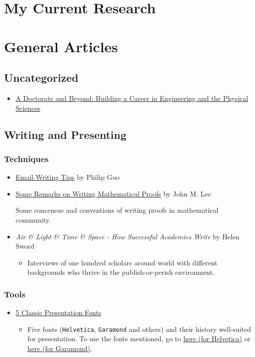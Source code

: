 \documentclass[11pt]{article}
\begin{document}
\section{My Current Research}
\label{sec-6}

\section{General Articles}
\label{sec-7}
\subsection{Uncategorized}
\label{sec-7-1}
\begin{itemize}
\item \href{http://www.adoctorateandbeyond.com/}{A Doctorate and Beyond: Building a Career in Engineering and the Physical Sciences}
\end{itemize}
\subsection{Writing and Presenting}
\label{sec-7-2}
\subsubsection{Techniques}
\label{sec-7-2-1}
\begin{itemize}
\item \href{http://pgbovine.net/email-tips.htm}{Email Writing Tips} by Philip Guo
\item \href{https://sites.math.washington.edu/~lee/Writing/writing-proofs.pdf}{Some Remarks on Writing Mathematical Proofs} by John M. Lee

Some concensus and conventions of writing proofs in mathematical community.
\item \emph{Air \& Light \& Time \& Space - How Successful Academics Write} by Helen Sword
\begin{itemize}
\item Interviews of one hundred scholars around world with different backgrounds who thrive
in the publish-or-perish environment.
\end{itemize}
\end{itemize}
\subsubsection{Tools}
\label{sec-7-2-2}
\begin{itemize}
\item \href{https://thepresentationdesigner.co.uk/5-classic-presentation-fonts/}{5 Classic Presentation Fonts}
\begin{itemize}
\item Five fonts (\verb~Helvetica~, \verb~Garamond~ and others)  and their history well-suited for presentation. To use
the fonts mentioned, go to \href{https://tex.stackexchange.com/questions/121061/working-with-arial-or-helvetica-fonts}{here (for Helvetica)} or \href{https://tex.stackexchange.com/questions/406816/how-can-i-get-a-garamond-font}{here (for Garamond)}.
\end{itemize}
\end{itemize}
\end{document}
